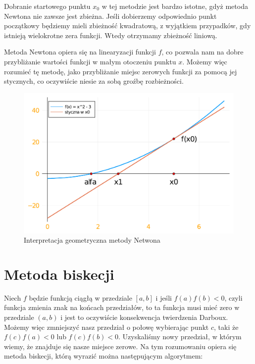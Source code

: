 \documentclass[a4paper]{article}
\begin{document}
    Dobranie startowego punktu $x_0$ w tej metodzie jest bardzo istotne, gdyż metoda Newtona nie zawsze jest zbieżna.
    Jeśli dobierzemy odpowiednio punkt początkowy będziemy mieli zbieżność kwadratową, z wyjątkiem przypadków, gdy 
    istnieją wielokrotne zera funkcji. Wtedy otrzymamy zbieżność liniową.

    \vspace{5mm}

    Metoda Newtona opiera się na linearyzacji funkcji $f$, co pozwala nam na dobre przybliżanie wartości funkcji w małym
    otoczeniu punktu $x$. Możemy więc rozumieć tę metodę, jako przybliżanie miejsc zerowych funkcji za pomocą jej stycznych,
    co oczywiście niesie za sobą groźbę rozbieżności.

    \vspace{10mm}

    \begin{figure}[h]
        \centering
        \includegraphics[width=12cm]{newtonPlot}
        \caption{Interpretacja geometryczna metody Netwona}
    \end{figure}

\newpage
\section{Metoda biskecji}
    Niech $f$ będzie funkcją ciągłą w przedziale $[a,b]$ i jeśli $f(a)f(b) < 0$, czyli funkcja zmienia znak na końcach przedziałów, to
    ta funkcja musi mieć zero w przedziale $(a,b)$ i jest to oczywiście konsekwencja twierdzenia Darboux. Możemy więc zmniejszyć nasz
    przedział o połowę wybierając punkt $c$, taki że $f(c)f(a) < 0$ lub $f(c)f(b) < 0$. Uzyskaliśmy nowy przedział, w którym wiemy, że
    znajduje się nasze miejsce zerowe. Na tym rozumowaniu opiera się metoda biskecji, którą wyrazić można następującym algorytmem:
\end{document}
